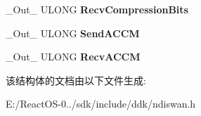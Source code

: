 \begin{DoxyCompactItemize}
\+\_\+\+Out\+\_\+ U\+L\+O\+NG {\bfseries Recv\+Compression\+Bits}
\item 
\mbox{\label{struct___n_d_i_s___w_a_n___c_o___g_e_t___l_i_n_k___i_n_f_o_ae6e74aa124c4468704f377ea42acf7b7}} 
\+\_\+\+Out\+\_\+ U\+L\+O\+NG {\bfseries Send\+A\+C\+CM}
\item 
\mbox{\label{struct___n_d_i_s___w_a_n___c_o___g_e_t___l_i_n_k___i_n_f_o_aeae963131c20f666ef2764fd898afff2}} 
\+\_\+\+Out\+\_\+ U\+L\+O\+NG {\bfseries Recv\+A\+C\+CM}
\end{DoxyCompactItemize}


该结构体的文档由以下文件生成\+:\begin{DoxyCompactItemize}
\item 
E\+:/\+React\+O\+S-\/0../sdk/include/ddk/ndiswan.\+h\end{DoxyCompactItemize}
